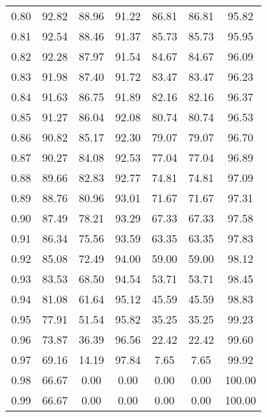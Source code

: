 \begin{tabular}{|c|c|c|c|c|c|c|}
      0.80 &     92.82 &     88.96 &      91.22 &   86.81 &      86.81 &         95.82 \\
      0.81 &     92.54 &     88.46 &      91.37 &   85.73 &      85.73 &         95.95 \\
      0.82 &     92.28 &     87.97 &      91.54 &   84.67 &      84.67 &         96.09 \\
      0.83 &     91.98 &     87.40 &      91.72 &   83.47 &      83.47 &         96.23 \\
      0.84 &     91.63 &     86.75 &      91.89 &   82.16 &      82.16 &         96.37 \\
      0.85 &     91.27 &     86.04 &      92.08 &   80.74 &      80.74 &         96.53 \\
      0.86 &     90.82 &     85.17 &      92.30 &   79.07 &      79.07 &         96.70 \\
      0.87 &     90.27 &     84.08 &      92.53 &   77.04 &      77.04 &         96.89 \\
      0.88 &     89.66 &     82.83 &      92.77 &   74.81 &      74.81 &         97.09 \\
      0.89 &     88.76 &     80.96 &      93.01 &   71.67 &      71.67 &         97.31 \\
      0.90 &     87.49 &     78.21 &      93.29 &   67.33 &      67.33 &         97.58 \\
      0.91 &     86.34 &     75.56 &      93.59 &   63.35 &      63.35 &         97.83 \\
      0.92 &     85.08 &     72.49 &      94.00 &   59.00 &      59.00 &         98.12 \\
      0.93 &     83.53 &     68.50 &      94.54 &   53.71 &      53.71 &         98.45 \\
      0.94 &     81.08 &     61.64 &      95.12 &   45.59 &      45.59 &         98.83 \\
      0.95 &     77.91 &     51.54 &      95.82 &   35.25 &      35.25 &         99.23 \\
      0.96 &     73.87 &     36.39 &      96.56 &   22.42 &      22.42 &         99.60 \\
      0.97 &     69.16 &     14.19 &      97.84 &    7.65 &       7.65 &         99.92 \\
      0.98 &     66.67 &      0.00 &       0.00 &    0.00 &       0.00 &        100.00 \\
      0.99 &     66.67 &      0.00 &       0.00 &    0.00 &       0.00 &        100.00 \\
\bottomrule
\end{tabular}
